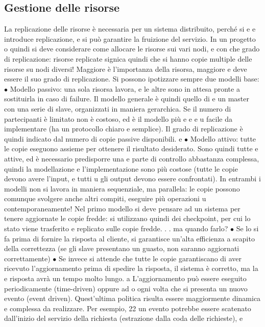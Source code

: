 \documentclass[a4paper,12pt]{article}
\begin{document}
\subsection{Gestione delle risorse}
La replicazione delle risorse è necessaria per un sistema distribuito, perché si
e
e
introduce replicazione, e si può garantire la fruizione del servizio. In un progetto
o
quindi si deve considerare come allocare le risorse sui vari nodi, e con che grado di replicazione: risorse replicate
signica quindi che si hanno copie multiple
delle risorse su nodi diversi! Maggiore è l'importanza della risorsa, maggiore
e
deve essere il suo grado di replicazione.
Si possono ipotizzare sempre due modelli base:
$\bullet$ Modello passivo: una sola risorsa lavora, e le altre sono in attesa pronte
a sostituirla in caso di failure. Il modello generale è quindi quello di
e
un master con una serie di slave, organizzati in maniera gerarchica. Se
il numero di partecipanti è limitato non è costoso, ed è il modello più
e
e
e
u
facile da implementare (ha un protocollo chiaro e semplice). Il grado di
replicazione è quindi indicato dal numero di copie passive disponibili.
e
$\bullet$ Modello attivo: tutte le copie eseguono assieme per ottenere il risultato
desiderato. Sono quindi tutte e attive, ed è necessario predisporre una
e
parte di controllo abbastanza complessa, quindi la modellazione e l'implementazione sono più costose (tutte le copie
devono avere l'input, e tutti
u
gli output devono essere confrontati).
In entrambi i modelli non si lavora in maniera sequenziale, ma parallela: le
copie possono comunque svolgere anche altri compiti, eseguire più operazioni
u
contemporaneamente!
Nel primo modello si deve pensare ad un sistema per tenere aggiornate le
copie fredde: si utilizzano quindi dei checkpoint, per cui lo stato viene trasferito
e replicato sulle copie fredde. . . ma quando farlo?
$\bullet$ Se lo si fa prima di fornire la risposta al cliente, si garantisce un'alta
efficienza a scapito della correttezza (se gli slave presentano un guasto,
non saranno aggiornati correttamente)
$\bullet$ Se invece si attende che tutte le copie garantiscano di aver ricevuto l'aggiornamento prima di spedire la
risposta, il sistema è corretto, ma la
e
risposta avrà un tempo molto lungo.
a
L'aggiornamento può essere eseguito periodicamente (time-driven) oppure ad
o
ogni volta che si presenta un nuovo evento (event driven). Quest'ultima politica
risulta essere maggiormente dinamica e complessa da realizzare. Per esempio,
22
un evento potrebbe essere scatenato dall'inizio del servizio della richiesta (estrazione dalla coda delle richieste), e
\end{document}
